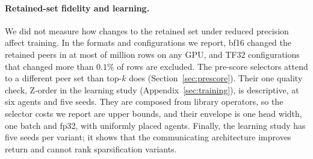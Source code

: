 \paragraph{Retained-set fidelity and learning.} We did not measure how changes to the
retained set under reduced precision affect training. In the formats and configurations
we report, bf16 changed the retained peers in at most \PortBfMismatchMax{} of
\PortBfRowsM{} million rows on any GPU, and TF32 configurations that changed
more than $0.1\%$ of rows are excluded. The pre-score selectors attend to a
different peer set than top-$k$ does (Section~\ref{sec:prescore}). Their one
quality check, Z-order in the learning study (Appendix~\ref{sec:training}), is
descriptive, at six agents and five seeds. They are composed from library
operators, so the selector costs we report are upper bounds, and their envelope
is one head width, one batch and fp32, with uniformly placed agents. Finally,
the learning study has five seeds per variant; it shows that the communicating
architecture improves return and cannot rank sparsification variants.
